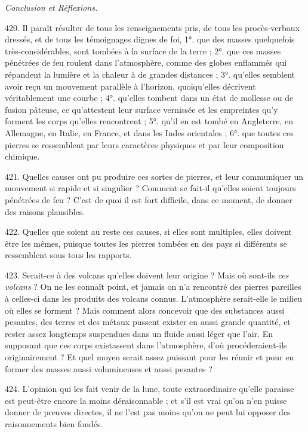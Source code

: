 \documentclass[a4paper, 11pt, oneside, polutonikogreek, french]{article}
\begin{document}
\begin{center}
\emph{Conclusion et Réflexions.}
\end{center}

420. Il paraît résulter de tous les renseignements pris, de tous les procès-verbaux dressés, et de tous les témoignages dignes de foi, 1°. que des masses quelquefois très-considérables, sont tombées à la surface de la terre ; 2°. que ces masses pénétrées de feu roulent dans l'atmosphère, comme des globes enflammés qui répandent la lumière et la chaleur à de grandes distances ; 3°. qu'elles semblent avoir reçu un mouvement parallèle à l'horizon, quoiqu'elles décrivent véritablement une courbe ; 4°. qu'elles tombent dans un état de mollesse ou de fusion pâteuse, ce qu'attestent leur surface vernissée et les empreintes qu'y forment les corps qu'elles rencontrent ; 5°. qu'il en est tombé en Angleterre, en Allemagne, en Italie, en France, et dans les Indes orientales ; 6°. que toutes ces pierres se ressemblent par leurs caractères physiques et par leur composition chimique.

421. Quelles causes ont pu produire ces sortes de pierres, et leur communiquer un mouvement si rapide et si singulier ? Comment se fait-il qu'elles soient toujours pénétrées de feu ? C'est de quoi il est fort difficile, dans ce moment, de donner des raisons plausibles.

422. Quelles que soient au reste ces causes, si elles sont multiples, elles doivent être les mêmes, puisque toutes les pierres tombées en des pays si différents se ressemblent sous tous les rapports.

423. Serait-ce à des volcans qu'elles doivent leur origine ? Mais où sont-ils \emph{ces volcans} ? On ne les connaît point, et jamais on n'a rencontré des pierres pareilles à celles-ci dans les produits des volcans connus. L'atmosphère serait-elle le milieu où elles se forment ? Mais comment alors concevoir que des substances aussi pesantes, des terres et des métaux pussent exister en aussi grande quantité, et rester assez longtemps suspendues dans un fluide aussi léger que l'air. En supposant que ces corps existassent dans l'atmosphère, d'où procéderaient-ils originairement ? Et quel moyen serait assez puissant pour les réunir et pour en former des masses aussi volumineuses et aussi pesantes ?

424. L'opinion qui les fait venir de la lune, toute extraordinaire qu'elle paraisse est peut-être encore la moins déraisonnable ; et s'il est vrai qu'on n'en puisse donner de preuves directes, il ne l'est pas moins qu'on ne peut lui opposer des raisonnements bien fondés.
\end{document}
